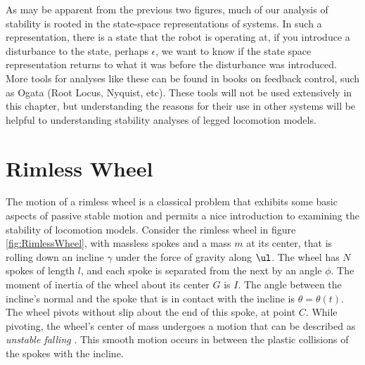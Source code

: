 As may be apparent from the previous two figures, much of our analysis of stability is rooted in the state-space representations of systems. In such a representation, there is a state that the robot is operating at, if you introduce a disturbance to the state, perhaps $\epsilon$, we want to know if the state space representation returns to what it was before the disturbance was introduced. More tools for analyses like these can be found in books on feedback control, such as Ogata \cite{ogata09} (Root Locus, Nyquist, etc). These tools will not be used extensively in this chapter, but understanding the reasons for their use in other systems will be helpful to understanding stability analyses of legged locomotion models. 


\section{Rimless Wheel} %
\label{sec:RimlessWheel}

The motion of a rimless wheel is a classical problem that exhibits some basic aspects of passive stable motion and permits a nice introduction to examining the stability of locomotion models. Consider the rimless wheel in figure \ref{fig:RimlessWheel}, with massless spokes and a mass $m$ at its center, that is rolling down an incline $\gamma$ under the force of gravity along $\ul$. The wheel has $N$ spokes of length $l$, and each spoke is separated from the next by an angle $\phi$. The moment of inertia of the wheel about its center $G$ is $I$. The angle between the incline's normal and the spoke that is in contact with the incline is $\theta = \theta(t)$. The wheel pivots without slip about the end of this spoke, at point $C$. While pivoting, the wheel's center of mass undergoes a motion that can be described as \textit{unstable falling} \cite{coleman96}. This smooth motion occurs in between the plastic collisions of the spokes with the incline.

